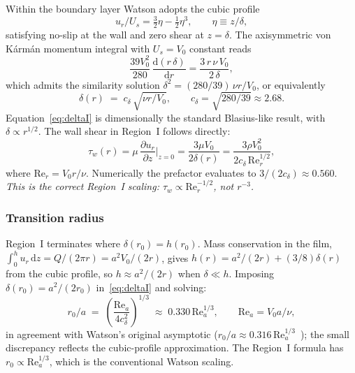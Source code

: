 \documentclass[aps,prfluids,reprint,amsmath,amssymb,floatfix]{revtex4-2}
\newcommand{\Rey}{\mathrm{Re}}
\newcommand{\dd}{\mathrm{d}}
\begin{document}
Within the boundary layer Watson adopts the cubic profile
\begin{equation}
  u_r/U_s = \tfrac{3}{2}\eta - \tfrac{1}{2}\eta^3,
  \qquad \eta \equiv z/\delta,
  \label{eq:cubic}
\end{equation}
satisfying no-slip at the wall and zero shear at $z = \delta$. The
axisymmetric von Kármán momentum integral with $U_s = V_0$ constant reads
\begin{equation}
  \frac{39 V_0^2}{280} \,\frac{\dd(r\,\delta)}{\dd r}
  = \frac{3\,r\,\nu\,V_0}{2\,\delta},
  \label{eq:karman}
\end{equation}
which admits the similarity solution $\delta^2 = (280/39)\,\nu r/V_0$,
or equivalently
\begin{equation}
  \boxed{\;\delta(r) \;=\; c_\delta\,\sqrt{\nu r/V_0},
  \qquad c_\delta = \sqrt{280/39} \approx 2.68.\;}
  \label{eq:deltaI}
\end{equation}
Equation~\eqref{eq:deltaI} is dimensionally the standard Blasius-like
result, with $\delta \propto r^{1/2}$. The wall shear in Region~I follows
directly:
\begin{equation}
  \tau_w(r) = \mu\,\frac{\partial u_r}{\partial z}\bigg|_{z=0}
  = \frac{3\mu V_0}{2\delta(r)}
  = \frac{3\rho V_0^2}{2 c_\delta\,\Rey_r^{1/2}},
  \label{eq:tauI}
\end{equation}
where $\Rey_r = V_0 r/\nu$. Numerically the prefactor evaluates to
$3/(2 c_\delta) \approx 0.560$. \emph{This is the correct Region~I scaling:
$\tau_w \propto \Rey_r^{-1/2}$, not $r^{-3}$.}

\subsubsection{Transition radius}

Region~I terminates where $\delta(r_0) = h(r_0)$. Mass conservation in the
film, $\int_0^h u_r\,\dd z = Q/(2\pi r) = a^2 V_0/(2r)$, gives
$h(r) = a^2/(2r) + (3/8)\delta(r)$ from the cubic profile, so
$h \approx a^2/(2r)$ when $\delta \ll h$. Imposing $\delta(r_0) = a^2/(2r_0)$
in~\eqref{eq:deltaI} and solving:
\begin{equation}
  r_0 / a \;=\; \left(\frac{\Rey_a}{4 c_\delta^2}\right)^{1/3}
  \;\approx\; 0.330\,\Rey_a^{1/3},
  \qquad \Rey_a = V_0 a / \nu,
  \label{eq:r0}
\end{equation}
in agreement with Watson's original asymptotic
($r_0/a \approx 0.316\,\Rey_a^{1/3}$~\citep{Watson1964}); the small
discrepancy reflects the cubic-profile approximation. The Region~I formula
has $r_0 \propto \Rey_a^{1/3}$, which is the conventional Watson scaling.
\end{document}
